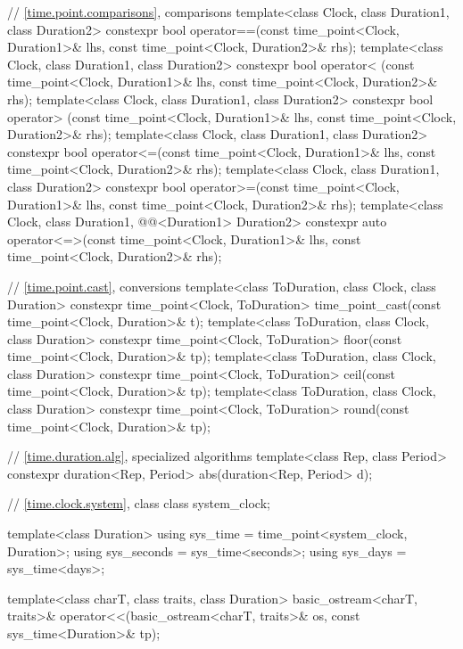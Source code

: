 \begin{codeblock}
{  // \ref{time.point.comparisons},  comparisons
  template<class Clock, class Duration1, class Duration2>
     constexpr bool operator==(const time_point<Clock, Duration1>& lhs,
                               const time_point<Clock, Duration2>& rhs);
  template<class Clock, class Duration1, class Duration2>
     constexpr bool operator< (const time_point<Clock, Duration1>& lhs,
                               const time_point<Clock, Duration2>& rhs);
  template<class Clock, class Duration1, class Duration2>
     constexpr bool operator> (const time_point<Clock, Duration1>& lhs,
                               const time_point<Clock, Duration2>& rhs);
  template<class Clock, class Duration1, class Duration2>
     constexpr bool operator<=(const time_point<Clock, Duration1>& lhs,
                               const time_point<Clock, Duration2>& rhs);
  template<class Clock, class Duration1, class Duration2>
     constexpr bool operator>=(const time_point<Clock, Duration1>& lhs,
                               const time_point<Clock, Duration2>& rhs);
  template<class Clock, class Duration1, @@<Duration1> Duration2>
     constexpr auto operator<=>(const time_point<Clock, Duration1>& lhs,
                                const time_point<Clock, Duration2>& rhs);

  // \ref{time.point.cast}, conversions
  template<class ToDuration, class Clock, class Duration>
    constexpr time_point<Clock, ToDuration>
      time_point_cast(const time_point<Clock, Duration>& t);
  template<class ToDuration, class Clock, class Duration>
    constexpr time_point<Clock, ToDuration> floor(const time_point<Clock, Duration>& tp);
  template<class ToDuration, class Clock, class Duration>
    constexpr time_point<Clock, ToDuration> ceil(const time_point<Clock, Duration>& tp);
  template<class ToDuration, class Clock, class Duration>
    constexpr time_point<Clock, ToDuration> round(const time_point<Clock, Duration>& tp);

  // \ref{time.duration.alg}, specialized algorithms
  template<class Rep, class Period>
    constexpr duration<Rep, Period> abs(duration<Rep, Period> d);

  // \ref{time.clock.system}, class 
  class system_clock;

  template<class Duration>
    using sys_time  = time_point<system_clock, Duration>;
  using sys_seconds = sys_time<seconds>;
  using sys_days    = sys_time<days>;

  template<class charT, class traits, class Duration>
    basic_ostream<charT, traits>&
      operator<<(basic_ostream<charT, traits>& os, const sys_time<Duration>& tp);

}
\end{codeblock}
